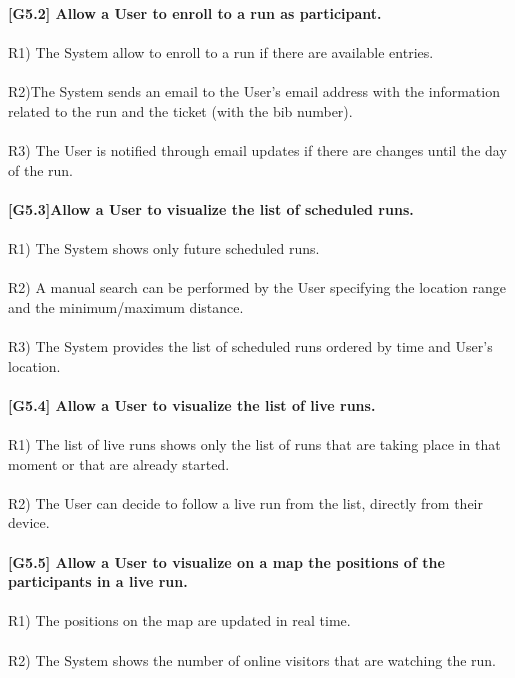\textbf{[G5.2] Allow a User to enroll to a run as participant.} \\ \\
R1) The System allow to enroll to a run if there are available entries. \\ \\
R2)The System sends an email to the User’s email address with the information related to the run and the ticket (with the bib number). \\ \\
R3) The User is notified through email updates if there are changes until the day of the run. \\ \\

\textbf{[G5.3]Allow a User to visualize the list of scheduled runs.} \\ \\
R1) The System shows only future scheduled runs. \\ \\ 
R2) A manual search can be performed by the User specifying the location range and the minimum/maximum distance. \\ \\ 
R3) The System provides the list of scheduled runs ordered by time and User’s location. \\ \\

\textbf{[G5.4] Allow a User to visualize the list of live runs.} \\ \\
R1) The list of live runs shows only the list of runs that are taking place in that moment or that are already started. \\ \\
R2) The User can decide to follow a live run from the list, directly from their device. \\ \\

\textbf{[G5.5] Allow a User to visualize on a map the positions of the participants in a live run.} \\ \\	
R1) The positions on the map are updated in real time. \\ \\
R2) The System shows the number of online visitors that are watching the run. \\


